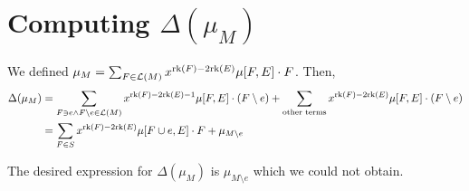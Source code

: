 \documentclass[11pt]{article}
\newcommand{\calL}{\mathcal{L}}
\newcommand{\rank}{\normalfont\text{rk}}
\theoremstyle{remark}
\begin{document}
\section*{Computing $\Delta(\mu_M)$}

We defined $\mu_M = \sum_{F \in \calL(M)} x^{\rank(F) - 2\rank(E)}\mu[F,E]\cdot F$. Then,
\begin{align*}
    \Delta(\mu_M) & = \sum_{F \ni e \wedge F\setminus e \in \calL(M)}x^{\rank(F) - 2\rank(E)-1}\mu[F,E]\cdot (F\setminus e)
    + \sum_{\text{other terms}} x^{\rank(F) - 2\rank(E)}\mu[F,E]\cdot (F\setminus e)                                        \\
                  & = \sum_{F \in S}x^{\rank(F) - 2\rank(E)}\mu[F \cup e,E]\cdot F + \mu_{M\setminus e}
\end{align*}

The desired expression for $\Delta(\mu_M)$ is $\mu_{M\setminus e}$ which we could not obtain.
\end{document}
